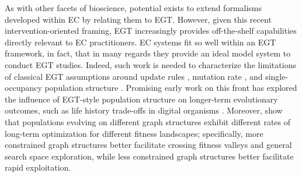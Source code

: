 As with other facets of bioscience, potential exists to extend formalisms developed within EC by relating them to EGT.
However, given this recent intervention-oriented framing, EGT increasingly provides off-the-shelf capabilities directly relevant to EC practitioners.
EC systems fit so well within an EGT framework, in fact, that in many regards they provide an ideal model system to conduct EGT studies.
Indeed, such work is needed to characterize the limitations of classical EGT assumptions around update rules \citep{hindersin2015most}, mutation rate \citep{sharma2023selfloops}, and single-occupancy population structure \citep{broom2012general}.
Promising early work on this front has explored the influence of EGT-style population structure on longer-term evolutionary outcomes, such as life history trade-offs in digital organisms \citep{gordon2025environmental,misevic2015shape}.
Moreover, \citet{gordon2025environmental} show that populations evolving on different graph structures exhibit different rates of long-term optimization for different fitness landscapes; specifically, more constrained graph structures better facilitate crossing fitness valleys and general search space exploration, while less constrained graph structures better facilitate rapid exploitation.
